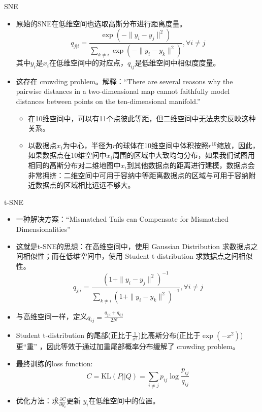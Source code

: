 \begin{frame}{SNE}
    \begin{itemize}
        \item 原始的SNE在低维空间也选取高斯分布进行距离度量。
        \[
            q_{j|i} = \frac{\exp(-\|y_i - y_j\|^2)}{\sum_{k \neq i} \exp(-\|y_i - y_k\|^2)}, \forall i \neq  j
        \]
        其中$y_i$是$x_i$在低维空间中的对应点，$q_{ij}$是低维空间中相似度度量。
        \item 这存在 crowding problem。解释：``There are several reasons why the pairwise distances in a two-dimensional map cannot faithfully
        model distances between points on the ten-dimensional manifold.''
        \begin{itemize}
            \item 在10维空间中，可以有11个点彼此等距，但二维空间中无法忠实反映这种关系。
            \item 以数据点$x_i$为中心，半径为$r$的球体在10维空间中体积按照$r^{10}$缩放，因此，如果数据点在10维空间中$x_i$周围的区域中大致均匀分布，如果我们试图用相同的高斯分布对二维地图中$x_i$到其他数据点的距离进行建模，数据点会非常拥挤：二维空间中可用于容纳中等距离数据点的区域与可用于容纳附近数据点的区域相比远远不够大。
        \end{itemize}
    \end{itemize}
\end{frame}

\begin{frame}{t-SNE}
    \begin{itemize}
        \item 一种解决方案：``Mismatched Tails can Compensate for Mismatched Dimensionalities''
        \item 这就是t-SNE的思想：在高维空间中，使用 Gaussian Distribution 求数据点之间相似性；而在低维空间中，使用 Student t-distribution 求数据点之间相似性。
        \[
            q_{j|i} = \frac{(1 + \|y_i - y_j\|^2)^{-1}}{\sum_{k \neq i} (1 + \|y_i - y_k\|^2)^{-1}}, \forall i \neq  j
        \]
        \item 与高维空间一样，定义$q_{ij} = \frac{q_{j|i} + q_{i|j}}{2N}$
        \item Student t-distribution 的尾部(正比于$\frac{1}{x^{2}}$)比高斯分布(正比于$\exp(-x^{2})$)更“重” ，因此等效于通过加重尾部概率分布缓解了 crowding problem。
        \item 最终训练的loss function:
        \[
            C = \text{KL}(P||Q) = \sum_{i\neq j} p_{ij} \log \frac{p_{ij}}{q_{ij}}
        \]
        \item 优化方法：求$\frac{\partial C}{\partial y_i}$更新 $y_i$在低维空间中的位置。
    \end{itemize}
\end{frame}

